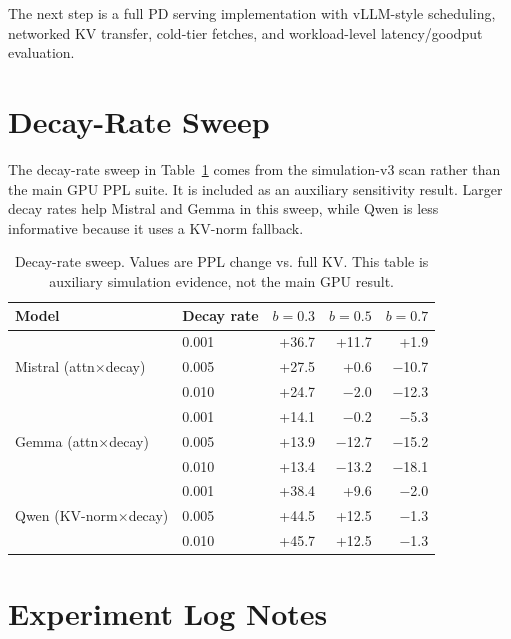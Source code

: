 \documentclass[11pt]{article}
\newcommand{\budget}{b}
\theoremstyle{plain}
\theoremstyle{definition}
\begin{document}
The next step is a full PD serving implementation with vLLM-style scheduling, networked KV transfer, cold-tier fetches, and workload-level latency/goodput evaluation.

\appendix

\section{Decay-Rate Sweep}
\label{app:decay}

The decay-rate sweep in Table~\ref{tab:decay} comes from the simulation-v3 scan rather than the main GPU PPL suite.  It is included as an auxiliary sensitivity result.  Larger decay rates help Mistral and Gemma in this sweep, while Qwen is less informative because it uses a KV-norm fallback.

\begin{table}[h]
\centering
\caption{Decay-rate sweep.  Values are PPL change vs. full KV.  This table is auxiliary simulation evidence, not the main GPU result.}
\label{tab:decay}
\small
\begin{tabular}{llrrr}
\toprule
Model & Decay rate & $\budget=0.3$ & $\budget=0.5$ & $\budget=0.7$ \\
\midrule
\multirow{3}{*}{Mistral (attn$\times$decay)} & 0.001 & +36.7 & +11.7 & +1.9 \\
 & 0.005 & +27.5 & +0.6 & $-$10.7 \\
 & 0.010 & +24.7 & $-$2.0 & $-$12.3 \\
\midrule
\multirow{3}{*}{Gemma (attn$\times$decay)} & 0.001 & +14.1 & $-$0.2 & $-$5.3 \\
 & 0.005 & +13.9 & $-$12.7 & $-$15.2 \\
 & 0.010 & +13.4 & $-$13.2 & $-$18.1 \\
\midrule
\multirow{3}{*}{Qwen (KV-norm$\times$decay)} & 0.001 & +38.4 & +9.6 & $-$2.0 \\
 & 0.005 & +44.5 & +12.5 & $-$1.3 \\
 & 0.010 & +45.7 & +12.5 & $-$1.3 \\
\bottomrule
\end{tabular}
\end{table}

\section{Experiment Log Notes}
\label{app:notes}
\end{document}
